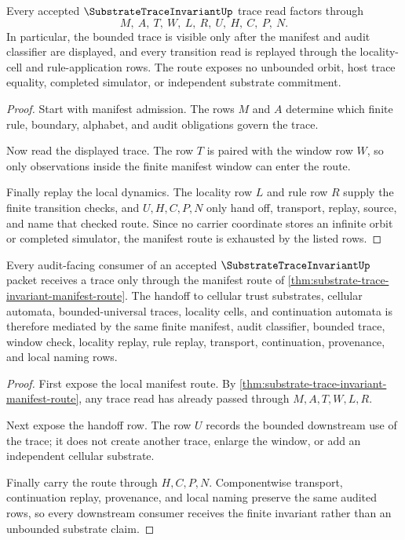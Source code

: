 \begin{theorem}
\label{thm:substrate-trace-invariant-manifest-route}
Every accepted $\SubstrateTraceInvariantUp$ trace read factors through
$$
M,\ A,\ T,\ W,\ L,\ R,\ U,\ H,\ C,\ P,\ N .
$$
In particular, the bounded trace is visible only after the manifest and audit classifier are displayed, and every transition read is replayed through the locality-cell and rule-application rows. The route exposes no unbounded orbit, host trace equality, completed simulator, or independent substrate commitment.
\end{theorem}
\begin{proof}
Start with manifest admission. The rows $M$ and $A$ determine which finite rule, boundary, alphabet, and audit obligations govern the trace.

Now read the displayed trace. The row $T$ is paired with the window row $W$, so only observations inside the finite manifest window can enter the route.

Finally replay the local dynamics. The locality row $L$ and rule row $R$ supply the finite transition checks, and $U,H,C,P,N$ only hand off, transport, replay, source, and name that checked route. Since no carrier coordinate stores an infinite orbit or completed simulator, the manifest route is exhausted by the listed rows.
\end{proof}

\begin{theorem}
\label{thm:substrate-trace-invariant-audit-handoff}
Every audit-facing consumer of an accepted $\SubstrateTraceInvariantUp$ packet receives a trace only through the manifest route of \autoref{thm:substrate-trace-invariant-manifest-route}. The handoff to cellular trust substrates, cellular automata, bounded-universal traces, locality cells, and continuation automata is therefore mediated by the same finite manifest, audit classifier, bounded trace, window check, locality replay, rule replay, transport, continuation, provenance, and local naming rows.
\end{theorem}
\begin{proof}
First expose the local manifest route. By \autoref{thm:substrate-trace-invariant-manifest-route}, any trace read has already passed through $M,A,T,W,L,R$.

Next expose the handoff row. The row $U$ records the bounded downstream use of the trace; it does not create another trace, enlarge the window, or add an independent cellular substrate.

Finally carry the route through $H,C,P,N$. Componentwise transport, continuation replay, provenance, and local naming preserve the same audited rows, so every downstream consumer receives the finite invariant rather than an unbounded substrate claim.
\end{proof}

